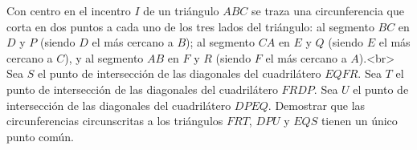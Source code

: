 Con centro en el incentro $I$ de un triángulo $ABC$ se traza una circunferencia que corta en dos puntos a cada uno de los tres lados del triángulo: al segmento $BC$ en $D$ y $P$ (siendo $D$ el más cercano a $B$); al segmento $CA$ en $E$ y $Q$ (siendo $E$ el más cercano a $C$), y al segmento $AB$ en $F$ y $R$ (siendo $F$ el más cercano a $A$).<br>
Sea $S$ el punto de intersección de las diagonales del cuadrilátero $EQFR$. Sea $T$ el punto de intersección de las diagonales del cuadrilátero $FRDP$. Sea $U$ el punto de intersección de las diagonales del cuadrilátero $DPEQ$. Demostrar que las circunferencias circunscritas a los triángulos $FRT$, $DPU$ y $EQS$ tienen un único punto común.
